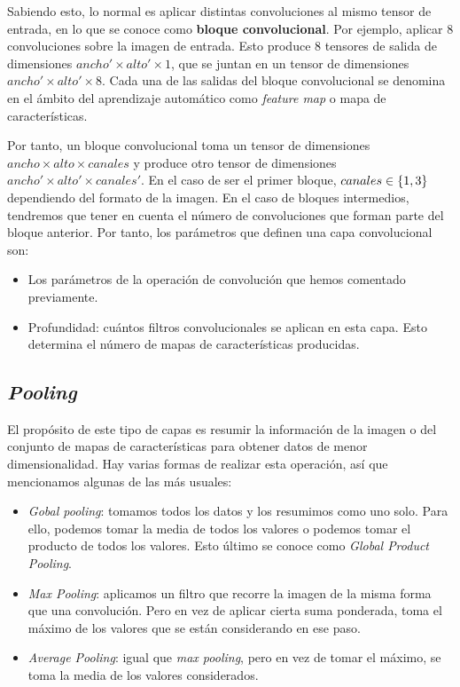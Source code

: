 Sabiendo esto, lo normal es aplicar distintas convoluciones al mismo tensor de entrada, en lo que se conoce como \textbf{bloque convolucional}. Por ejemplo, aplicar 8 convoluciones sobre la imagen de entrada. Esto produce 8 tensores de salida de dimensiones $ancho' \times alto' \times 1$, que se juntan en un tensor de dimensiones $ancho' \times alto' \times 8$. Cada una de las salidas del bloque convolucional se denomina en el ámbito del aprendizaje automático como \textit{feature map} o mapa de características.

Por tanto, un bloque convolucional toma un tensor de dimensiones $ancho \times alto \times canales$ y produce otro tensor de dimensiones $ancho' \times alto' \times canales'$. En el caso de ser el primer bloque, $canales \in \{ 1, 3 \}$ dependiendo del formato de la imagen. En el caso de bloques intermedios, tendremos que tener en cuenta el número de convoluciones que forman parte del bloque anterior. Por tanto, los parámetros que definen una capa convolucional son:

\begin{itemize}
    \item Los parámetros de la operación de convolución que hemos comentado previamente.
    \item Profundidad: cuántos filtros convolucionales se aplican en esta capa. Esto determina el número de mapas de características producidas.
\end{itemize}

\subsection{\textit{Pooling}}

El propósito de este tipo de capas es resumir la información de la imagen o del conjunto de mapas de características para obtener datos de menor dimensionalidad. Hay varias formas de realizar esta operación, así que mencionamos algunas de las más usuales:

\begin{itemize}
    \item \textit{Gobal pooling}: tomamos todos los datos y los resumimos como uno solo. Para ello, podemos tomar la media de todos los valores o podemos tomar el producto de todos los valores. Esto último se conoce como \textit{Global Product Pooling}.
    \item \textit{Max Pooling}: aplicamos un filtro que recorre la imagen de la misma forma que una convolución. Pero en vez de aplicar cierta suma ponderada, toma el máximo de los valores que se están considerando en ese paso.
    \item \textit{Average Pooling}: igual que \textit{max pooling}, pero en vez de tomar el máximo, se toma la media de los valores considerados.
\end{itemize}

